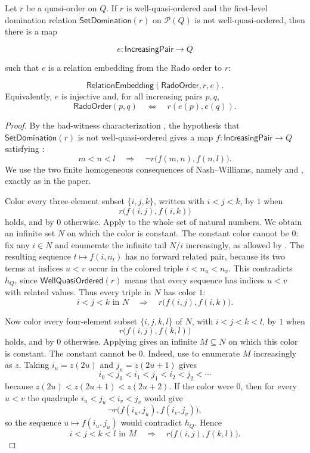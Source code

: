 \begin{theorem}
Let $r$ be a quasi-order on $Q$.  If $r$ is well-quasi-ordered and the
first-level domination relation $\mathsf{SetDomination}(r)$ on
$\mathcal P(Q)$ is not well-quasi-ordered, then there is a map

\[
e:\mathsf{IncreasingPair}\longrightarrow Q
\]

such that $e$ is a relation embedding from the Rado order to $r$:

\[
\mathsf{RelationEmbedding}(\mathsf{RadoOrder},r,e).
\]
Equivalently, $e$ is injective and, for all increasing pairs $p,q$,
\[
\mathsf{RadoOrder}(p,q)\quad\Longleftrightarrow\quad r(e(p),e(q)).
\]
\end{theorem}
\begin{proof}
By the bad-witness characterization ,
the hypothesis that $\mathsf{SetDomination}(r)$ is not well-quasi-ordered
gives a map $f:\mathsf{IncreasingPair}\to Q$ satisfying
:
\[
 m<n<l\quad\Longrightarrow\quad
 \neg r\bigl(f(m,n),f(n,l)\bigr).
\]
We use the two finite homogeneous consequences of Nash--Williams,
namely  and
, exactly as in the paper.

Color every three-element subset $\{i,j,k\}$, written with
$i<j<k$, by $1$ when
\[
r\bigl(f(i,j),f(i,k)\bigr)
\]
holds, and by $0$ otherwise.  Apply  to the
whole set of natural numbers.  We obtain an infinite set $N$ on which
the color is constant.  The constant color cannot be $0$: fix any
$i\in N$ and enumerate the infinite tail $N/i$ increasingly, as allowed
by .  The resulting sequence
$t\mapsto f(i,n_t)$ has no forward related pair, because its two terms
at indices $u<v$ occur in the colored triple
$i<n_u<n_v$.  This contradicts $h_Q$, since
$\mathsf{WellQuasiOrdered}(r)$ means that every sequence has indices
$u<v$ with related values.  Thus every triple in $N$ has color $1$:
\[
i<j<k\text{ in }N\quad\Longrightarrow\quad
r\bigl(f(i,j),f(i,k)\bigr).
\tag{1}
\]

Now color every four-element subset $\{i,j,k,l\}$ of $N$, with
$i<j<k<l$, by $1$ when
\[
r\bigl(f(i,j),f(k,l)\bigr)
\]
holds, and by $0$ otherwise.  Applying
 gives an infinite $M\subseteq N$ on
which this color is constant.  The constant cannot be $0$.  Indeed,
use  to enumerate $M$ increasingly as
$z$.  Taking $i_u=z(2u)$ and $j_u=z(2u+1)$ gives
\[
i_0<j_0<i_1<j_1<i_2<j_2<\cdots
\]
because $z(2u)<z(2u+1)<z(2u+2)$.  If the color were $0$, then for
every $u<v$ the quadruple
$i_u<j_u<i_v<j_v$ would give
\[
\neg r\bigl(f(i_u,j_u),f(i_v,j_v)\bigr),
\]
so the sequence $u\mapsto f(i_u,j_u)$ would contradict $h_Q$.  Hence
\[
i<j<k<l\text{ in }M\quad\Longrightarrow\quad
r\bigl(f(i,j),f(k,l)\bigr).
\tag{2}
\]


\end{proof}

